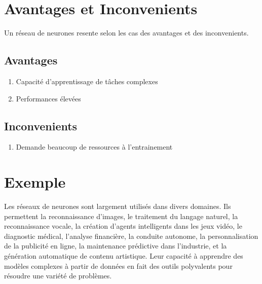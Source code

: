 \documentclass[a0,portrait]{a0poster}
\begin{document}

\section*{Avantages et Inconvenients}

Un réseau de neurones resente selon les cas des avantages et des inconvenients.

\subsection*{Avantages}

\begin{enumerate}
    \item Capacité d'apprentissage de tâches complexes
    \item Performances élevées
\end{enumerate}

\subsection*{Inconvenients}

\begin{enumerate}
    \item Demande beaucoup de ressources à l'entrainement

\end{enumerate}


\section*{Exemple}

Les réseaux de neurones sont largement utilisés dans divers domaines. Ils permettent la reconnaissance d'images, le traitement du langage naturel, la reconnaissance vocale, la création d'agents intelligents dans les jeux vidéo, le diagnostic médical, l'analyse financière, la conduite autonome, la personnalisation de la publicité en ligne, la maintenance prédictive dans l'industrie, et la génération automatique de contenu artistique. Leur capacité à apprendre des modèles complexes à partir de données en fait des outils polyvalents pour résoudre une variété de problèmes.
\end{document}
